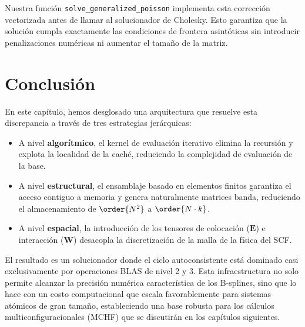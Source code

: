 Nuestra función \texttt{solve\_generalized\_poisson} implementa esta corrección vectorizada antes de llamar al solucionador de Cholesky. Esto garantiza que la solución cumpla exactamente las condiciones de frontera asintóticas sin introducir penalizaciones numéricas ni aumentar el tamaño de la matriz.

\section{Conclusión}

En este capítulo, hemos desglosado una arquitectura que resuelve esta discrepancia a través de tres estrategias jerárquicas:

\begin{itemize}
    \item A nivel \textbf{algorítmico}, el kernel de evaluación iterativo elimina la recursión y explota la localidad de la caché, reduciendo la complejidad de evaluación de la base.
    \item A nivel \textbf{estructural}, el ensamblaje basado en elementos finitos garantiza el acceso contiguo a memoria y genera naturalmente matrices banda, reduciendo el almacenamiento de \( \order{N^2} \) a \( \order{N \cdot k} \).
    \item A nivel \textbf{espacial}, la introducción de los tensores de colocación (\(\bm{E}\)) e interacción (\(\mathbf{W}\)) desacopla la discretización de la malla de la física del SCF.
\end{itemize}

El resultado es un solucionador donde el ciclo autoconsistente está dominado casi exclusivamente por operaciones BLAS de nivel 2 y 3. Esta infraestructura no solo permite alcanzar la precisión numérica característica de los B-splines, sino que lo hace con un costo computacional que escala favorablemente para sistemas atómicos de gran tamaño, estableciendo una base robusta para los cálculos multiconfiguracionales (MCHF) que se discutirán en los capítulos siguientes.

